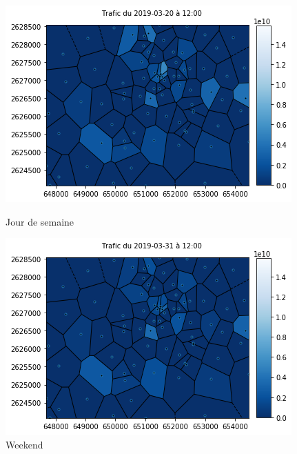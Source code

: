 \documentclass{report}
\begin{document}
\begin{figure}[!htb]
   \begin{minipage}{0.4\textwidth}
     \centering
     \includegraphics[scale=0.55]{images/12_20.png}
     \caption{Jour de semaine}\label{Fig:Data1}
   \end{minipage}\hfill
   \begin{minipage}{0.4\textwidth}
     \centering
     \includegraphics[scale=0.55]{images/12_31.png}
     \caption{Weekend }\label{Fig:Data2}
   \end{minipage}
\end{figure} 
\end{document}
